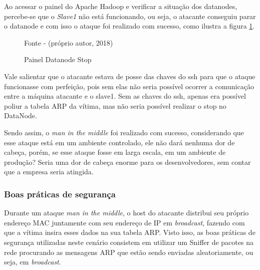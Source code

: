 Ao acessar o painel do Apache Hadoop e verificar a situação dos datanodes, percebe-se que o \textit{Slave1} não está funcionando, ou seja, o atacante conseguiu parar o datanode e com isso o ataque foi realizado com sucesso, como ilustra a figura \ref{Fig:painelDatanodeStop}.

\begin{figure}[htbp!] \begin{center}
\caption{Painel Datanode Stop}
\small{Fonte - (próprio autor, 2018)}
\label{Fig:painelDatanodeStop}
\end{center} \end{figure}

Vale salientar que o atacante estava de posse das chaves do ssh para que o ataque funcionasse com perfeição, pois sem elas não seria possível ocorrer a comunicação entre a máquina atacante e o slave1. Sem as chaves do ssh, apenas era possível poliur a tabela ARP da vítima, mas não seria possível realizar o stop no DataNode.


Sendo assim, o \textit{man in the middle} foi realizado com sucesso, considerando que esse ataque está em um ambiente controlado, ele não dará nenhuma dor de cabeça, porém, se esse ataque fosse em larga escala, em um ambiente de produção? Seria uma dor de cabeça enorme para os desenvolvedores, sem contar que a empresa seria atingida.

\subsubsection{Boas práticas de segurança}

Durante um ataque \textit{man in the middle}, o host do atacante distribui seu próprio endereço MAC juntamente com seu endereço de IP em \textit{broadcast}, fazendo com que a vítima insira esses dados na sua tabela ARP. Visto isso, as boas práticas de segurança utilizadas neste cenário consistem em utilizar um Sniffer de pacotes na rede procurando as mensagens ARP que estão sendo enviadas aleatoriamente, ou seja, em \textit{broadcast}.

